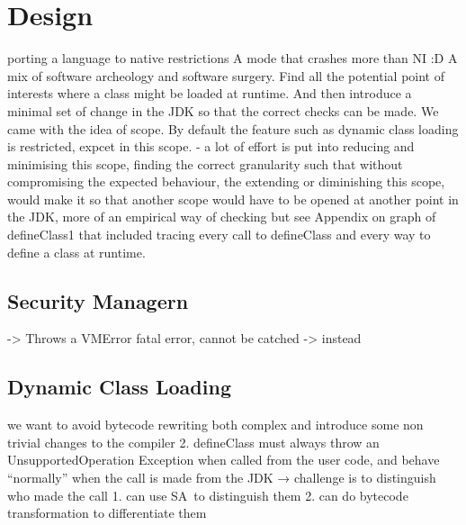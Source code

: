 

\chapter{Design}

porting a language to native restrictions
A mode that crashes more than NI :D
A mix of software archeology and software surgery.
Find all the potential point of interests where a class might be loaded at runtime.
And then introduce a minimal set of change in the JDK so that the correct checks can be made.
We came with the idea of scope. By default the feature such as dynamic class loading is restricted, expcet in this scope.
- a lot of effort is put into reducing and minimising this scope, finding the correct granularity such that without compromising
the expected behaviour, the extending or diminishing this scope, would make it so that another scope would have to be opened at another point in the JDK, more of an empirical way of checking but see Appendix on graph of defineClass1
that included tracing every call to defineClass and every way to define a class at runtime.
\section{Security Managern}
-> Throws a VMError fatal error, cannot be catched
-> instead

\section{Dynamic Class Loading}
we want to avoid bytecode rewriting both complex and introduce some non trivial changes to the compiler
2. defineClass must always throw an UnsupportedOperation Exception when called from the user code, and behave “normally” when the call is made from the JDK → challenge is to distinguish who made the call
    1. can use SA to distinguish them
    2. can do bytecode transformation to differentiate them

